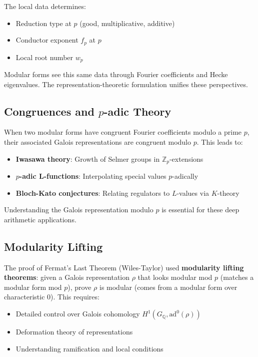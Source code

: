 \documentclass[11pt]{article}
\begin{document}
The local data determines:
\begin{itemize}
\item Reduction type at $p$ (good, multiplicative, additive)
\item Conductor exponent $f_p$ at $p$
\item Local root number $w_p$
\end{itemize}

Modular forms see this same data through Fourier coefficients and Hecke eigenvalues. The representation-theoretic formulation unifies these perspectives.

\subsection{Congruences and $p$-adic Theory}

When two modular forms have congruent Fourier coefficients modulo a prime $p$, their associated Galois representations are congruent modulo $p$. This leads to:
\begin{itemize}
\item \textbf{Iwasawa theory}: Growth of Selmer groups in $\mathbb{Z}_p$-extensions
\item \textbf{$p$-adic L-functions}: Interpolating special values $p$-adically
\item \textbf{Bloch-Kato conjectures}: Relating regulators to $L$-values via $K$-theory
\end{itemize}

Understanding the Galois representation modulo $p$ is essential for these deep arithmetic applications.

\subsection{Modularity Lifting}

The proof of Fermat's Last Theorem (Wiles-Taylor) used \textbf{modularity lifting theorems}: given a Galois representation $\rho$ that looks modular mod $p$ (matches a modular form mod $p$), prove $\rho$ is modular (comes from a modular form over characteristic 0). This requires:
\begin{itemize}
\item Detailed control over Galois cohomology $H^1(G_{\mathbb{Q}}, \text{ad}^0(\rho))$
\item Deformation theory of representations
\item Understanding ramification and local conditions
\end{itemize}
\end{document}
